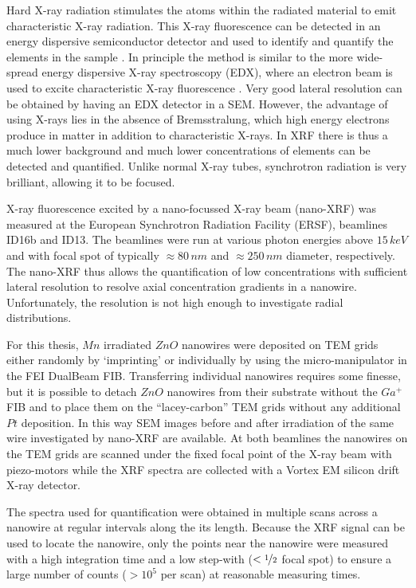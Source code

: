 Hard X-ray radiation stimulates the atoms within the radiated material to emit characteristic X-ray radiation. This X-ray fluorescence can be detected in an energy dispersive semiconductor detector and used to identify and quantify the elements in the sample \cite{glocker_quantitative_1928}. In principle the method is similar to the more wide-spread energy dispersive X-ray spectroscopy (EDX), where an electron beam is used to excite characteristic X-ray fluorescence \cite{jansen_elemental_1982}. Very good lateral resolution can be obtained by having an EDX detector in a SEM. However, the advantage of using X-rays lies in the absence of Bremsstralung, which high energy electrons produce in matter in addition to characteristic X-rays. In XRF there is thus a much lower background and much lower concentrations of elements can be detected and quantified. Unlike normal X-ray tubes, synchrotron radiation is very brilliant, allowing it to be focused. 

X-ray fluorescence excited by a nano-focussed X-ray beam (nano-XRF) was measured at the European Synchrotron Radiation Facility (ERSF), beamlines ID16b and ID13. The beamlines were run at various photon energies above $15\,keV$ and with focal spot of typically $\approx 80\,nm$ and $\approx 250\,nm$ diameter, respectively. The nano-XRF thus allows the quantification of low concentrations with sufficient lateral resolution to resolve axial concentration gradients in a nanowire. Unfortunately, the resolution is not high enough to investigate radial distributions. 

For this thesis, $Mn$ irradiated $ZnO$ nanowires were deposited on TEM grids either randomly by `imprinting' or individually by using the micro-manipulator in the FEI DualBeam FIB. Transferring individual nanowires requires some finesse, but it is possible to detach $ZnO$ nanowires from their substrate without the $Ga^+$ FIB and to place them on the ``lacey-carbon'' TEM grids without any additional $Pt$ deposition. In this way SEM images before and after irradiation of the same wire investigated by nano-XRF are available. At both beamlines the nanowires on the TEM grids are scanned under the fixed focal point of the X-ray beam with piezo-motors while the XRF spectra are collected with a Vortex EM silicon drift X-ray detector.



The spectra used for quantification were obtained in multiple scans across a nanowire at regular intervals along the its length. Because the XRF signal can be used to locate the nanowire, only the points near the nanowire were measured with a high integration time and a low step-with ($< \nicefrac{1}{2}$ focal spot) to ensure a large number of counts ($> 10^5$ per scan) at reasonable measuring times.



